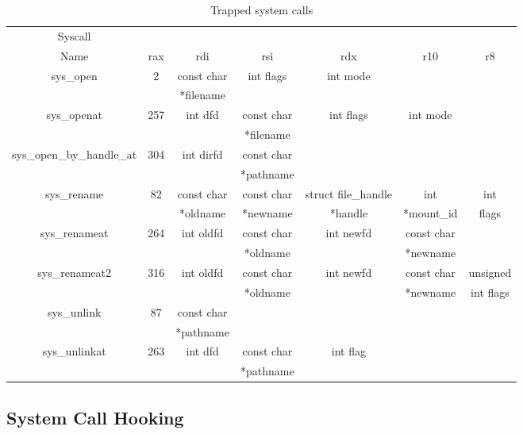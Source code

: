\begin{table}[h]
	\centering
	\footnotesize
	\caption{Trapped system calls}
	\label{tbl:prototypes}
	\begin{tabular}{ccccccc}
		\toprule
		Syscall 					&           	&  				& 				&  						&  					&   		\\
		Name 						& rax		  	& rdi 			& rsi 			& rdx 					& r10 				& r8 		\\
		\toprule
		sys\_open 					& 2 			&	const char	&	int flags	&	int mode			&					&		 	\\
					 				&   			&	*filename	&				&						&					&		 	\\
		\hline
		sys\_openat 				& 257  			&	int dfd		&	const char 	&	int flags			&	int mode		&	 		\\
					 				&   			&				&	*filename	&						&					&		 	\\
		\hline
		sys\_open\_by\_handle\_at 	& 304  			&	int dirfd	&	const char	&						&					&		 	\\
									&   			&				&	*pathname	&						&					&		 	\\
		\hline
		sys\_rename 				& 82  			&	const char	&	const char	&	struct file\_handle	&	int 			&	int 	\\
					 				&   			&	*oldname	&	*newname	&	*handle				&	*mount\_id		&	flags	\\
		\hline
		sys\_renameat 				& 264  			&	int oldfd	&	const char 	&	int newfd			&	const char 		&	 		\\
					 				&   			&				&	*oldname	&						&	*newname		& 			\\ 
		\hline
		sys\_renameat2 				& 316  			&	int oldfd	&	const char 	&	int newfd			&	const char 		&	unsigned 		\\
									&   			&				&	*oldname	&						&	*newname		& 	int flags		\\ 
		\hline
		sys\_unlink 				& 87  			&	const char	&				&						&					&		 	\\
					 				&   			&	*pathname	&				&						&					&		 	\\ 
		\hline
		sys\_unlinkat 				& 263  			&	int dfd		&	const char	&	int flag			&					&		 	\\
					 				&   			&				&	*pathname	&						&					&		 	\\
		\bottomrule
	\end{tabular}	
\end{table}



\subsection{System Call Hooking}\label{sub:hooking}

